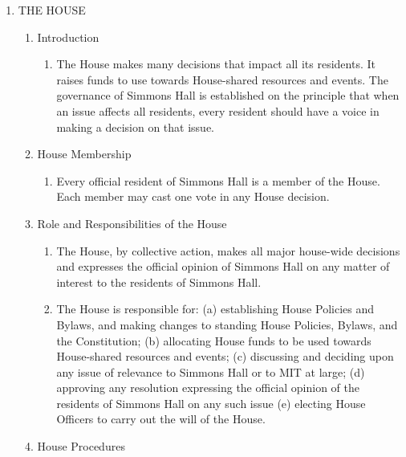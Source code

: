 \documentclass[letterpaper]{article}
\newcounter{saveenum}
\newcommand\liststyleWWNumv{%
\renewcommand\theenumi{\Roman{enumi}}
\renewcommand\theenumii{\arabic{enumii}}
\renewcommand\theenumiii{\arabic{enumiii}}
\renewcommand\theenumiv{\arabic{enumiv}}
\renewcommand\labelenumi{\theenumi.}
\renewcommand\labelenumii{\theenumii.}
\renewcommand\labelenumiii{\theenumiii)}
\renewcommand\labelenumiv{\theenumiv.}
}
\begin{document}
\bigskip

\liststyleWWNumv
\setcounter{saveenum}{\value{enumi}}
\begin{enumerate}
\setcounter{enumi}{\value{saveenum}}
\item THE HOUSE 

\begin{enumerate}
\item Introduction 

\begin{enumerate}
\item The House makes many decisions that impact all its residents. It
raises funds to use towards House-shared resources and events. The
governance of Simmons Hall is established on the principle that when an
issue affects all residents, every resident should have a voice in
making a decision on that issue. 
\end{enumerate}
\item House Membership 

\begin{enumerate}
\item Every official resident of Simmons Hall is a member of the House.
Each member may cast one vote in any House decision.
\end{enumerate}
\item Role and Responsibilities of the House 

\begin{enumerate}
\item The House, by collective action, makes all major house-wide
decisions and expresses the official opinion of Simmons Hall on any
matter of interest to the residents of Simmons Hall.
\item The House is responsible for: (a) establishing House Policies and
Bylaws, and making changes to standing House Policies, Bylaws, and the
Constitution; (b) allocating House funds to be used towards
House-shared resources and events; (c) discussing and deciding upon any
issue of relevance to Simmons Hall or to MIT at large; (d) approving
any resolution expressing the official opinion of the residents of
Simmons Hall on any such issue (e) electing House Officers to carry out
the will of the House.
\end{enumerate}
\item House Procedures 


\end{enumerate}
\end{enumerate}
\end{document}

